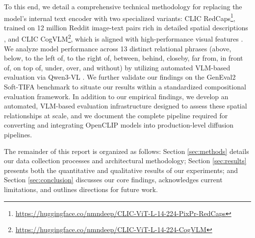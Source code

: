 To this end, we detail a comprehensive technical methodology for replacing the model's internal text encoder with two specialized variants: CLIC RedCaps\footnote{\url{https://huggingface.co/nmndeep/CLIC-ViT-L-14-224-PixPr-RedCaps}}, trained on 12 million Reddit image-text pairs rich in detailed spatial descriptions \citep{desai2021redcapswebcuratedimagetextdata}, and CLIC CogVLM\footnote{\url{https://huggingface.co/nmndeep/CLIC-ViT-L-14-224-CogVLM}}, which is aligned with high-performance visual features \citep{wang2024cogvlmvisualexpertpretrained}. We analyze model performance across 13 distinct relational phrases (above, below, to the left of, to the right of, between, behind, closeby, far from, in front of, on top of, under, over, and without) by utilizing automated VLM-based evaluation via Qwen3-VL \citep{bai2023qwenvlversatilevisionlanguagemodel}. We further validate our findings on the GenEval2 Soft-TIFA benchmark \citep{kamath2025geneval} to situate our results within a standardized compositional evaluation framework. In addition to our empirical findings, we develop an automated, VLM-based evaluation infrastructure designed to assess these spatial relationships at scale, and we document the complete pipeline required for converting and integrating OpenCLIP models into production-level diffusion pipelines.

The remainder of this report is organized as follows: Section \ref{sec:methods} details our data collection processes and architectural methodology; Section \ref{sec:results} presents both the quantitative and qualitative results of our experiments; and Section \ref{sec:conclusion} discusses our core findings, acknowledges current limitations, and outlines directions for future work.